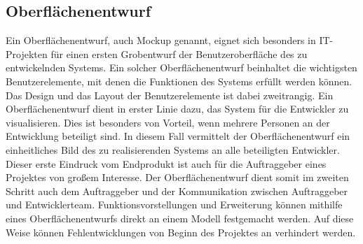 \subsection{Oberflächenentwurf}
\label{sec:Oberflaechenentwuf}

Ein Oberflächenentwurf, auch Mockup genannt, eignet sich besonders in
IT-Projekten für einen ersten Grobentwurf der Benutzeroberfläche des zu
entwickelnden Systems. Ein solcher Oberflächenentwurf beinhaltet die wichtigsten
Benutzerelemente, mit denen die Funktionen des Systems erfüllt werden können.
Das Design und das Layout der Benutzerelemente ist dabei zweitrangig. Ein
Oberflächenentwurf dient in erster Linie dazu, das System für die Entwickler zu
visualisieren. Dies ist besonders von Vorteil, wenn mehrere Personen an der
Entwicklung beteiligt sind. In diesem Fall vermittelt der Oberflächenentwurf ein
einheitliches Bild des zu realisierenden Systems an alle beteiligten
Entwickler. Dieser erste Eindruck vom Endprodukt ist auch für die Auftraggeber
eines Projektes von großem Interesse. Der Oberflächenentwurf dient somit im
zweiten Schritt auch dem Auftraggeber und der Kommunikation zwischen
Auftraggeber und Entwicklerteam. Funktionsvorstellungen und Erweiterung können
mithilfe eines Oberflächenentwurfs direkt an einem Modell festgemacht werden.
Auf diese Weise können Fehlentwicklungen von Beginn des Projektes an verhindert
werden.


